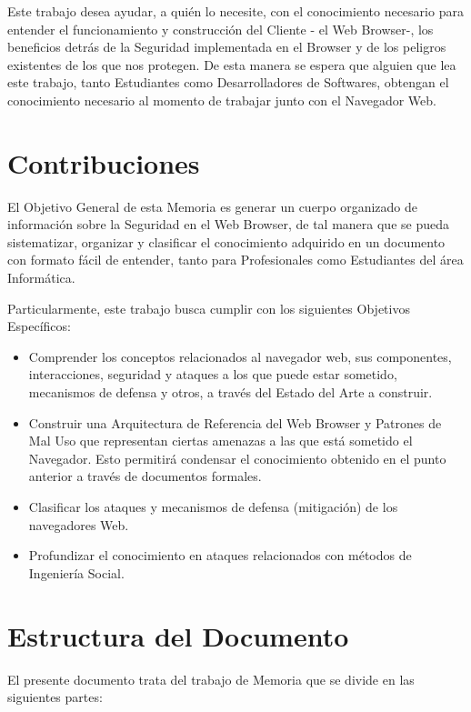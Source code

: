 Este trabajo desea ayudar, a quién lo necesite, con el conocimiento necesario para entender el funcionamiento y construcción del Cliente - el Web Browser-, los beneficios detrás de la Seguridad implementada en el Browser y de los peligros existentes de los que nos protegen. De esta manera se espera que alguien que lea este trabajo, tanto Estudiantes como Desarrolladores de Softwares, obtengan el conocimiento necesario al momento de trabajar junto con el Navegador Web. 



\section{Contribuciones}
\label{chap:contr}

El Objetivo General de esta Memoria es generar un cuerpo organizado de información sobre la Seguridad en el Web Browser, de tal manera que se pueda sistematizar, organizar y clasificar el conocimiento adquirido en un documento con formato fácil de entender, tanto para Profesionales como Estudiantes del área Informática. 

Particularmente, este trabajo busca cumplir con los siguientes Objetivos Específicos:

\begin{itemize}
	\item Comprender los conceptos relacionados al navegador web, sus componentes, interacciones, seguridad y ataques a los que puede estar sometido, mecanismos de defensa y otros, a través del Estado del Arte a construir.
	\item Construir una Arquitectura de Referencia del Web Browser y Patrones de Mal Uso que representan ciertas amenazas a las que está sometido el Navegador. Esto permitirá condensar el conocimiento obtenido en el punto anterior a través de documentos formales.
	\item Clasificar los ataques y mecanismos de defensa (mitigación) de los navegadores Web.
	\item Profundizar el conocimiento en ataques relacionados con métodos de Ingeniería Social.
	
\end{itemize} 


\section{Estructura del Documento}
\label{chap:estruct}

El presente documento trata del trabajo de Memoria que se divide en las siguientes partes:


